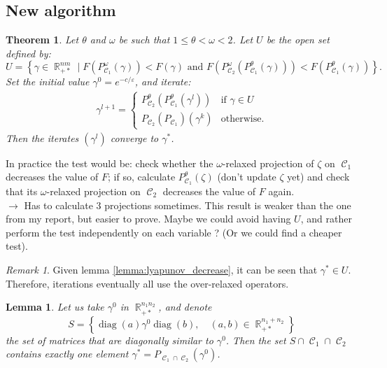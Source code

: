 \documentclass{article} %
\DeclareMathOperator{\IR}{\mathbb{R}}
\DeclareMathOperator{\Ccal}{\mathcal{C}}
\DeclareMathOperator{\diag}{diag}
\renewcommand{\epsilon}{\varepsilon}
\theoremstyle{plain}
\newtheorem{theorem}{Theorem}
\newtheorem{lemma}{Lemma}
\theoremstyle{definition}
\theoremstyle{remark}
\newtheorem{remark}{Remark}
\begin{document}
\subsection{New algorithm}

\begin{theorem}
	Let $\theta$ and $\omega$ be such that $1\le \theta < \omega < 2$. Let $U$ be the open set defined by:
	\begin{equation}\label{eq:open_set_U}
	U = \left\{
	\gamma \in \IR_{+*}^{nm} \mid
	F(P^\omega_{\Ccal_1}(\gamma)) < F(\gamma)
	\text{ and }
	F(P^\omega_{\Ccal_2}(P^\theta_{\Ccal_1}(\gamma))) < F(P^\theta_{\Ccal_1}(\gamma))
	\right\}.
	\end{equation}
	Set the initial value $\gamma^0 = e^{-c/\epsilon}$, and iterate:
	\begin{align*}
	\gamma^{l+1} =
	\begin{cases}
	P^\theta_{\Ccal_2}(P^\theta_{\Ccal_1}(\gamma^l)) & \text{if } \gamma \in U \\
	P_{\Ccal_2}(P_{\Ccal_1})(\gamma^k) & \text{otherwise.}
	\end{cases}
	\end{align*}
	Then the iterates $(\gamma^l)$ converge to $\gamma^*$.
\end{theorem}
{\color{red} 
	In practice the test would be: check whether the $\omega$-relaxed projection of $\zeta$ on $\Ccal_1$ decreases the value of
	$F$; if so, calculate $P_{\Ccal_1}^\theta(\zeta)$ (don't update $\zeta$ yet) and check that its $\omega$-relaxed projection on $\Ccal_2$ decreases the value of $F$ again. \\
	$\longrightarrow$ Has to calculate 3 projections sometimes. This result is weaker than the one from my report, but easier to prove. Maybe we could avoid having $U$, and rather perform the test independently on each variable ? (Or we could find a cheaper test).}
\begin{remark}
	Given lemma \ref{lemma:lyapunov_decrease}, it can be seen that $\gamma^* \in U$. Therefore, iterations eventually all use the over-relaxed operators.
\end{remark}

\begin{lemma}
	\label{lemma:trivial_intersection}
	Let us take $\gamma^0$ in $\IR_{+*}^{n_1 n_2}$,
	and denote
	\[
	S = \left\{
	\diag(a) \gamma^0 \diag(b),\quad
	(a,b) \in \IR_{+*}^{n_1 + n_2}
	\right\}
	\]
	the set of matrices that are diagonally similar to $\gamma^0$.
	Then the set $S \cap \Ccal_1 \cap \Ccal_2$ contains exactly one element $\gamma^* = P_{\Ccal_1 \cap \Ccal_2}(\gamma^0)$.
\end{lemma}
\end{document}

